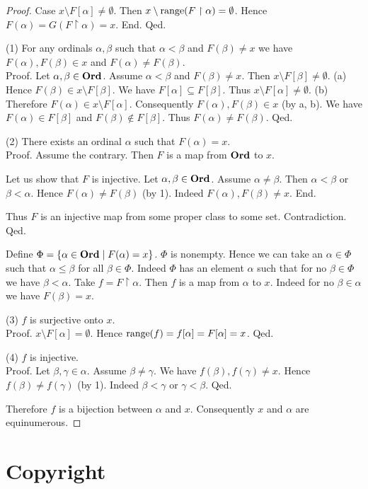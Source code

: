 \documentclass{article}
\begin{document}
\begin{forthel}
\begin{proof}
        Case $x \setminus F[\alpha] \neq \emptyset$.
          Then $x \setminus \textrm{range}(F \restriction \alpha) = \emptyset$.
          Hence $F(\alpha)
            = G(F \restriction \alpha)
            = x$.
        End.
      Qed.

      (1) For any ordinals $\alpha, \beta$ such that $\alpha < \beta$ and $F(\beta) \neq x$ we have $F(\alpha), F(\beta) \in x$ and $F(\alpha) \neq F(\beta)$. \\
      Proof.
        Let $\alpha, \beta \in \textbf{Ord}$.
        Assume $\alpha < \beta$ and $F(\beta) \neq x$.
        Then $x \setminus F[\beta] \neq \emptyset$.
        (a) Hence $F(\beta) \in x \setminus F[\beta]$.
        We have $F[\alpha] \subseteq F[\beta]$.
        Thus $x \setminus F[\alpha] \neq \emptyset$.
        (b) Therefore $F(\alpha) \in x \setminus F[\alpha]$.
        Consequently $F(\alpha), F(\beta) \in x$ (by a, b).
        We have $F(\alpha) \in F[\beta]$ and $F(\beta) \notin F[\beta]$.
        Thus $F(\alpha) \neq F(\beta)$.
      Qed.

      (2) There exists an ordinal $\alpha$ such that $F(\alpha) = x$. \\
      Proof.
        Assume the contrary.
        Then $F$ is a map from $\textbf{Ord}$ to $x$.

        Let us show that $F$ is injective.
          Let $\alpha, \beta \in \textbf{Ord}$.
          Assume $\alpha \neq \beta$.
          Then $\alpha < \beta$ or $\beta < \alpha$.
          Hence $F(\alpha) \neq F(\beta)$ (by 1).
          Indeed $F(\alpha), F(\beta) \neq x$.
        End.

        Thus $F$ is an injective map from some proper class to some set.
        Contradiction.
      Qed.

      Define $\Phi = \{ \alpha \in \textbf{Ord} \mid F(\alpha) = x \}$.
      $\Phi$ is nonempty.
      Hence we can take an $\alpha \in \Phi$ such that $\alpha \leq \beta$ for all $\beta \in \Phi$.
      Indeed $\Phi$ has an element $\alpha$ such that for no $\beta \in \Phi$ we have $\beta < \alpha$.
      Take $f = F \restriction \alpha$.
      Then $f$ is a map from $\alpha$ to $x$.
      Indeed for no $\beta \in \alpha$ we have $F(\beta) = x$.

      (3) $f$ is surjective onto $x$. \\
      Proof.
        $x \setminus F[\alpha] = \emptyset$.
        Hence $\textrm{range}(f)
          = f[\alpha]
          = F[\alpha]
          = x$.
      Qed.

      (4) $f$ is injective. \\
      Proof.
        Let $\beta, \gamma \in \alpha$.
        Assume $\beta \neq \gamma$.
        We have $f(\beta), f(\gamma) \neq x$.
        Hence $f(\beta) \neq f(\gamma)$ (by 1).
        Indeed $\beta < \gamma$ or $\gamma < \beta$.
      Qed.

      Therefore $f$ is a bijection between $\alpha$ and $x$.
      Consequently $x$ and $\alpha$ are equinumerous.
    \end{proof}
  \end{forthel}

  \printbibliography

  \section*{Copyright}
  \doclicenseThis
\end{document}

